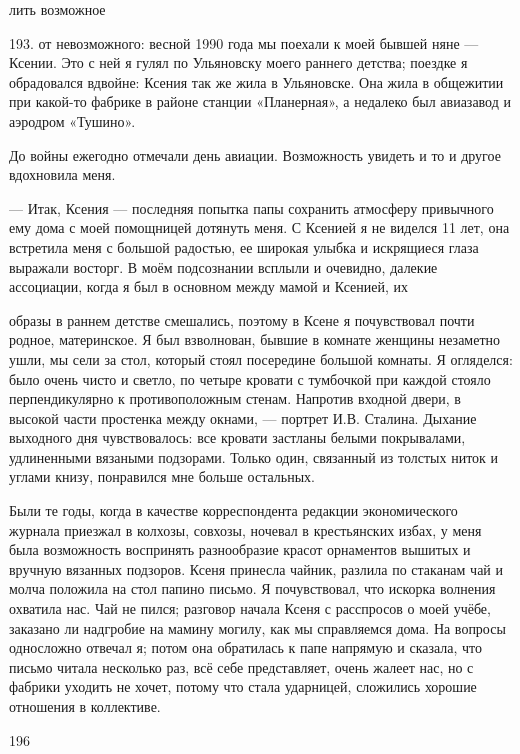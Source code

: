 лить возможное

193. от невозможного: весной 1990 года мы поехали к моей бывшей няне — Ксении. Это с ней я гулял по Ульяновску моего раннего детства; поездке я обрадовался вдвойне: Ксения так же жила в Ульяновске. Она жила в общежитии при какой-то фабрике в районе станции «Планерная», а недалеко был авиазавод и аэродром «Тушино».

До войны ежегодно отмечали день авиации. Возможность увидеть и то и другое вдохновила меня.

— Итак, Ксения — последняя попытка папы сохранить атмосферу привычного ему дома с моей помощницей дотянуть меня. С Ксенией я не виделся 11 лет, она встретила меня с большой радостью, ее широкая улыбка и искрящиеся глаза выражали восторг. В моём подсознании всплыли и очевидно, далекие ассоциации, когда я был в основном между мамой и Ксенией, их

образы в раннем детстве смешались, поэтому в Ксене я почувствовал почти родное, материнское. Я был взволнован, бывшие в комнате женщины незаметно ушли, мы сели за стол, который стоял посередине большой комнаты. Я огляделся: было очень чисто и светло, по четыре кровати с тумбочкой при каждой стояло перпендикулярно к противоположным стенам. Напротив входной двери, в высокой части простенка между окнами, — портрет И.В. Сталина. Дыхание выходного дня чувствовалось: все кровати застланы белыми покрывалами, удлиненными вязаными подзорами. Только один, связанный из толстых ниток и углами книзу, понравился мне больше остальных.

Были те годы, когда в качестве корреспондента редакции экономического журнала приезжал в колхозы, совхозы, ночевал в крестьянских избах, у меня была возможность воспринять разнообразие красот орнаментов вышитых и вручную вязанных подзоров. Ксеня принесла чайник, разлила по стаканам чай и молча положила на стол папино письмо. Я почувствовал, что искорка волнения охватила нас. Чай не пился; разговор начала Ксеня с расспросов о моей учёбе, заказано ли надгробие на мамину могилу, как мы справляемся дома. На вопросы односложно отвечал я; потом она обратилась к папе напрямую и сказала, что письмо читала несколько раз, всё себе представляет, очень жалеет нас, но с фабрики уходить не хочет, потому что стала ударницей, сложились хорошие отношения в коллективе.

196

